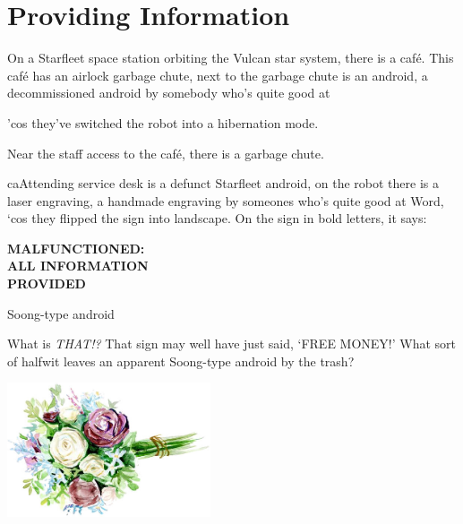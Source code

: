\chapter{Providing Information}

On a Starfleet space station orbiting the Vulcan star system, there is a caf{\'e}. This caf{\'e} has an airlock garbage chute, next to the garbage chute is an android, a decommissioned android by somebody who's quite good at

'cos they've switched the robot into a hibernation mode.

Near the staff access to the caf{\'e}, there is a garbage chute.

caAttending service desk is a defunct Starfleet android, on the robot there is a laser engraving, a handmade engraving by someones who's quite good at Word, `cos they flipped the sign into landscape. On the sign in bold letters, it says:

\begin{center}
\textbf{
MALFUNCTIONED: \\
ALL INFORMATION \\
PROVIDED
}
\end{center}

Soong-type android

What is \textit{THAT!?} That sign may well have just said, `FREE MONEY!' What sort of halfwit leaves an apparent Soong-type android by the trash? 

\vspace{5mm}
\begin{center}
\includegraphics[width=0.45\textwidth]{graphics/flower.jpg}
\end{center}
